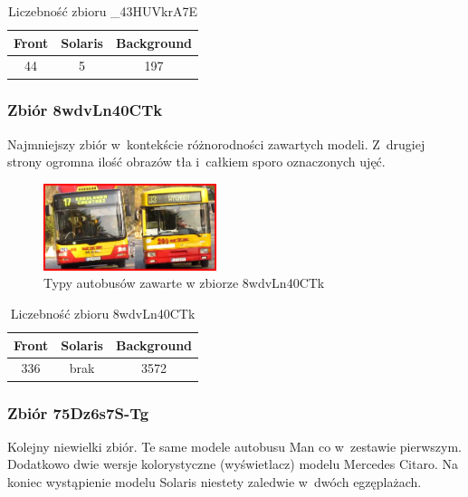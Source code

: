 \begin{table}[!h]
    \centering
    \begin{tabular}{c|c|c}
        Front   & Solaris   & Background \\ \hline
        44      & 5         & 197 
    \end{tabular}
    \caption{Liczebność zbioru \_43HUVkrA7E}
    \label{tab:_43HUVkrA7E_count}
\end{table}

\subsubsection{Zbiór 8wdvLn40CTk}

Najmniejszy zbiór w~kontekście różnorodności zawartych modeli. Z~drugiej
strony ogromna ilość obrazów tła i~całkiem sporo oznaczonych ujęć.

\begin{figure}[!h]
    \centering
    \includegraphics[width=0.45\textwidth]{img/exp_trainig_data_8wd}
    \caption{Typy autobusów zawarte w zbiorze 8wdvLn40CTk}
    \label{fig:8wdvLn40CTk_types}
\end{figure}

\begin{table}[!h]
    \centering
    \begin{tabular}{c|c|c}
        Front   & Solaris   & Background \\ \hline
        336     & brak      & 3572
    \end{tabular}
    \caption{Liczebność zbioru 8wdvLn40CTk}
    \label{tab:8wdvLn40CTk_count}
\end{table}

\subsubsection{Zbiór 75Dz6s7S-Tg}

Kolejny niewielki zbiór. Te same modele autobusu Man co w~zestawie
pierwszym. Dodatkowo dwie wersje kolorystyczne (wyświetlacz) modelu
Mercedes Citaro. Na koniec wystąpienie modelu Solaris niestety zaledwie
w~dwóch egzęplażach.

